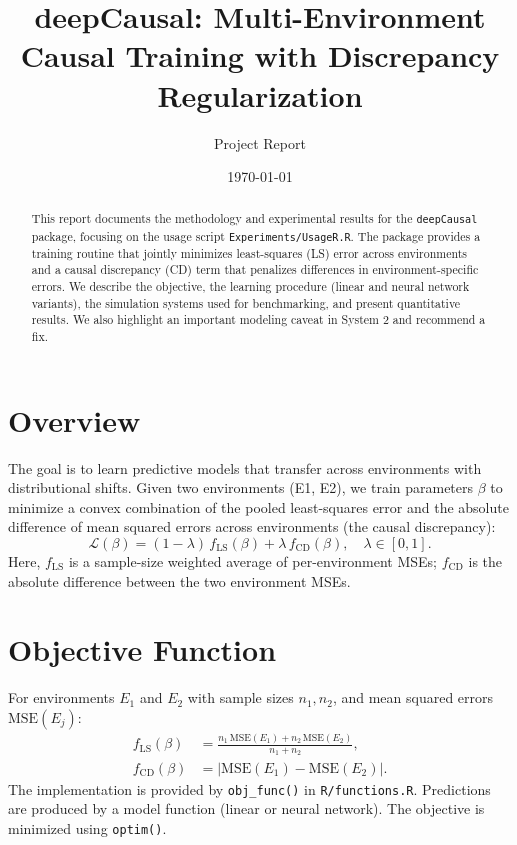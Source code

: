 \documentclass[11pt,a4paper]{article}
\title{deepCausal: Multi-Environment Causal Training with Discrepancy Regularization}
\author{Project Report}
\date{\today}
\begin{document}
\maketitle
\listoftables

\begin{abstract}
This report documents the methodology and experimental results for the \texttt{deepCausal} package, focusing on the usage script \texttt{Experiments/UsageR.R}. The package provides a training routine that jointly minimizes least-squares (LS) error across environments and a causal discrepancy (CD) term that penalizes differences in environment-specific errors. We describe the objective, the learning procedure (linear and neural network variants), the simulation systems used for benchmarking, and present quantitative results. We also highlight an important modeling caveat in System 2 and recommend a fix.
\end{abstract}

\section{Overview}
The goal is to learn predictive models that transfer across environments with distributional shifts. Given two environments (E1, E2), we train parameters \(\beta\) to minimize a convex combination of the pooled least-squares error and the absolute difference of mean squared errors across environments (the causal discrepancy):
\begin{equation}
\mathcal{L}(\beta) = (1 - \lambda)\, f_{\mathrm{LS}}(\beta) + \lambda\, f_{\mathrm{CD}}(\beta), \quad \lambda \in [0, 1].
\end{equation}
Here, \(f_{\mathrm{LS}}\) is a sample-size weighted average of per-environment MSEs; \(f_{\mathrm{CD}}\) is the absolute difference between the two environment MSEs.

\section{Objective Function}
For environments \(E_1\) and \(E_2\) with sample sizes \(n_1, n_2\), and mean squared errors \(\text{MSE}(E_j)\):
\begin{align}
  f_{\mathrm{LS}}(\beta) &= \frac{n_1\, \text{MSE}(E_1) + n_2\, \text{MSE}(E_2)}{n_1 + n_2}, \\
  f_{\mathrm{CD}}(\beta) &= \bigl|\text{MSE}(E_1) - \text{MSE}(E_2)\bigr|.
\end{align}
The implementation is provided by \texttt{obj\_func()} in \texttt{R/functions.R}. Predictions are produced by a model function (linear or neural network). The objective is minimized using \texttt{optim()}.
\end{document}
